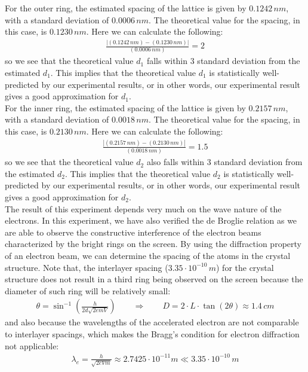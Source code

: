 \documentclass[11pt]{book}
\theoremstyle{break}
\theoremstyle{break}
\begin{document}
For the outer ring, the estimated spacing of the lattice is given by $0.1242\, nm$, with a standard deviation of $0.0006\, nm$. The theoretical value for the spacing, in this case, is $0.1230 \, nm$. Here we can calculate the following:
\begin{align*}
\frac{|(0.1242\, nm) - (0.1230\,nm)|}{(0.0006\, nm)} =2 
\end{align*}
so we see that the theoretical value $d_1$ falls within $3$ standard deviation from the estimated $d_1$. This implies that the theoretical value $d_1$ is statistically well-predicted by our experimental results, or in other words, our experimental result gives a good approximation for $d_1$.\\


For the inner ring, the estimated spacing of the lattice is given by $0.2157\, nm$, with a standard deviation of $0.0018\, nm$. The theoretical value for the spacing, in this case, is $0.2130 \, nm$. Here we can calculate the following:
\begin{align*}
\frac{|(0.2157\, nm) - (0.2130\,nm)|}{(0.0018\, nm)} =1.5 
\end{align*}
so we see that the theoretical value $d_2$ also falls within $3$ standard deviation from the estimated $d_2$. This implies that the theoretical value $d_2$ is statistically well-predicted by our experimental results, or in other words, our experimental result gives a good approximation for $d_2$.\\


The result of this experiment depends very much on the wave nature of the electrons. In this experiment, we have also verified the de Broglie relation as we are able to observe the constructive interference of the electron beams characterized by the bright rings on the screen. By using the diffraction property of an electron beam, we can determine the spacing of the atoms in the crystal structure. Note that, the interlayer spacing ($3.35 \cdot 10^{-10}\, m$) for the crystal structure does not result in a third ring being observed on the screen because the diameter of such ring will be relatively small:
\begin{align*}
\theta = \sin^{-1}\left(\frac{h}{2d \sqrt{2em V}}\right) \qquad \Rightarrow \qquad D = 2\cdot L \cdot \tan(2\theta)\approx 1.4\, cm \tag{$V=5\, kV$}
\end{align*}
and also because the wavelengths of the accelerated electron are not comparable to interlayer spacings, which makes the Bragg's condition for electron diffraction not applicable:
\begin{align*}
\lambda_e = \frac{h}{\sqrt{2e Vm}} \approx 2.7425\cdot 10^{-11} m \ll 3.35 \cdot 10^{-10}\, m \tag{$V = 2\, kV$}
\end{align*}
\end{document}
